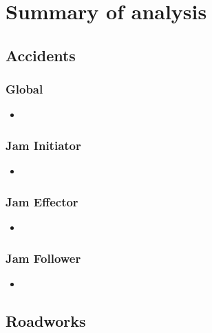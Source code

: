 \chapter{Summary of analysis}
\label{analysis_summary}


\section{Accidents}

\subsection{Global}

\begin{itemize}
    \item 
\end{itemize}

\subsection{Jam Initiator}

\begin{itemize}
    \item 
\end{itemize}

\subsection{Jam Effector}

\begin{itemize}
    \item 
\end{itemize}

\subsection{Jam Follower}

\begin{itemize}
    \item 
\end{itemize}

\section{Roadworks}



